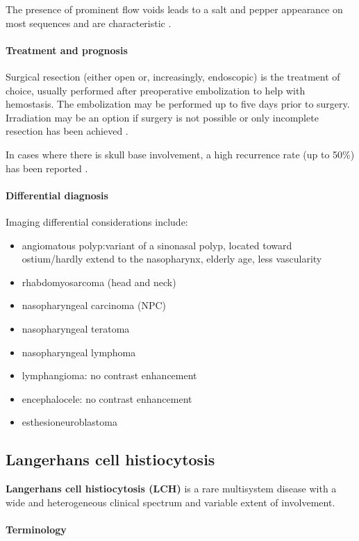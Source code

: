 The presence of prominent flow voids leads to a salt and pepper appearance on most sequences and are characteristic .


\paragraph{Treatment and prognosis}

Surgical resection (either open or, increasingly, endoscopic) is the treatment of choice, usually performed after preoperative embolization to help with hemostasis. The embolization may be performed up to five days prior to surgery. Irradiation may be an option if surgery is not possible or only incomplete resection has been achieved .

In cases where there is skull base involvement, a high recurrence rate (up to 50\%) has been reported .


\paragraph{Differential diagnosis}

Imaging differential considerations include:

\begin{itemize}
	\item
	angiomatous polyp:variant of a sinonasal polyp, located toward ostium/hardly extend to the nasopharynx, elderly age, less vascularity
	\item
	rhabdomyosarcoma (head and neck)
	\item
	nasopharyngeal carcinoma (NPC)
	\item
	nasopharyngeal teratoma
	\item
	nasopharyngeal lymphoma
	\item
	lymphangioma: no contrast enhancement
	\item
	encephalocele: no contrast enhancement
	\item
	esthesioneuroblastoma
\end{itemize}
\subsection{Langerhans cell histiocytosis}

\textbf{Langerhans cell histiocytosis (LCH)} is a rare multisystem disease with a wide and heterogeneous clinical spectrum and variable extent of involvement.

\paragraph{Terminology}

